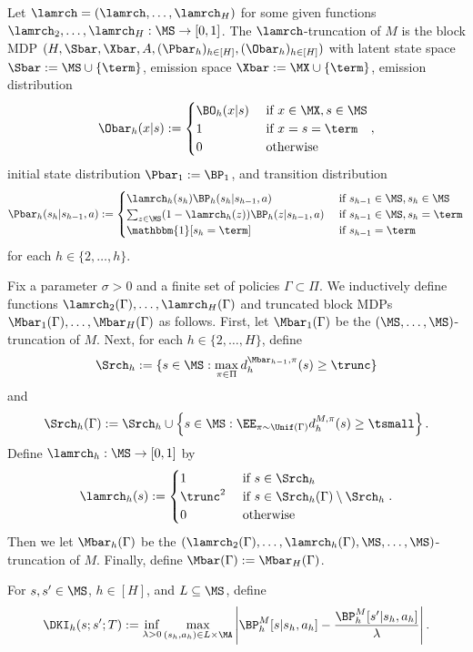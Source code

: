 \begin{definition}
Let $\lamrch = (\lamrch,\dots,\lamrch_H)$ for some given functions $\lamrch_2,\dots,\lamrch_H: \MS \to [0,1]$. The $\lamrch$-truncation of $M$ is the block MDP $(H, \Sbar,\Xbar,A,(\Pbar_h)_{h\in[H]},(\Obar_h)_{h\in[H]})$ with latent state space $\Sbar := \MS \cup \{\term\}$, emission space $\Xbar := \MX \cup \{\term\}$, emission distribution
\[\Obar_h(x|s) := \begin{cases} \BO_h(x|s) & \text{ if } x \in \MX, s \in \MS \\ 1 & \text{ if } x=s=\term \\ 0 & \text{ otherwise} \end{cases},\]
initial state distribution $\Pbar_1 := \BP_1$, and transition distribution
\[\Pbar_h(s_h|s_{h-1},a) := \begin{cases} \lamrch_h(s_h) \BP_h(s_h|s_{h-1},a) & \text{ if } s_{h-1} \in \MS, s_h \in \MS \\ \sum_{z \in \MS} (1-\lamrch_h(z)) \BP_h(z|s_{h-1},a) &\text{ if } s_{h-1} \in \MS, s_h = \term \\ \mathbbm{1}[s_h=\term] & \text{ if } s_{h-1} = \term \end{cases} \]
for each $h \in \{2,\dots,h\}$.
\end{definition}

Fix a parameter $\sigma > 0$ and a finite set of policies $\Gamma \subset \Pi$. We inductively define functions $\lamrch_2(\Gamma),\dots,\lamrch_H(\Gamma)$ and truncated block MDPs $\Mbar_1(\Gamma),\dots,\Mbar_H(\Gamma)$ as follows. First, let $\Mbar_1(\Gamma)$ be the $(\MS,\dots,\MS)$-truncation of $M$. Next, for each $h \in \{2,\dots,H\}$, define \[\Srch_h := \{s \in \MS: \max_{\pi\in\Pi} d^{\Mbar_{h-1}, \pi}_h(s) \geq \trunc\}\]
and \[\Srch_h(\Gamma) := \Srch_h \cup \left\{s \in \MS: \EE_{\pi\sim\Unif(\Gamma)} d^{M,\pi}_h(s) \geq \tsmall\right\}.\]
Define $\lamrch_h: \MS \to [0,1]$ by 
\[\lamrch_h(s) := 
\begin{cases} 
1 & \text{ if } s \in \Srch_h \\
\trunc^2 & \text{ if } s \in \Srch_h(\Gamma) \setminus \Srch_h \\ 
0 & \text{ otherwise} 
\end{cases}.\]
Then we let $\Mbar_h(\Gamma)$ be the $(\lamrch_2(\Gamma),\dots,\lamrch_h(\Gamma),\MS,\dots,\MS)$-truncation of $M$. Finally, define $\Mbar(\Gamma) := \Mbar_H(\Gamma)$.
\fi



\iffalse
\begin{definition}
For $s,s' \in \MS$, $h \in [H]$, and $L \subseteq \MS$, define
\[\DKI_h(s;s';T) := \inf_{\lambda>0} \max_{(s_h,a_h) \in L\times\MA} \left|\BP^M_h[s|s_h,a_h] - \frac{\BP^M_h[s'|s_h,a_h]}{\lambda}\right|.\]
\end{definition}

